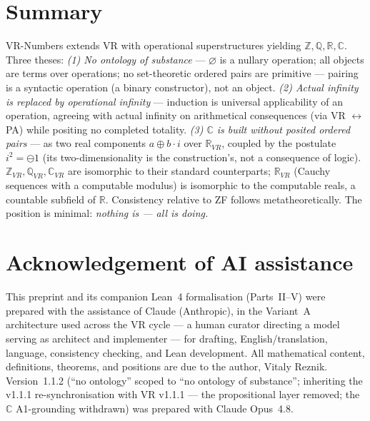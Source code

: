 \documentclass[11pt]{article}
\theoremstyle{definition}
\newcommand{\zero}{\varnothing}
\newcommand{\Z}{\mathbb{Z}}
\newcommand{\Q}{\mathbb{Q}}
\newcommand{\R}{\mathbb{R}}
\newcommand{\C}{\mathbb{C}}
\newcommand{\isub}{\ominus}              %
\begin{document}
\section*{Summary}
VR-Numbers extends VR with operational superstructures yielding $\Z,\Q,\R,\C$. Three theses:
\emph{(1) No ontology of substance} --- $\zero$ is a nullary operation; all objects are terms over operations; no
set-theoretic ordered pairs are primitive --- pairing is a syntactic operation (a binary constructor),
not an object. \emph{(2) Actual infinity is replaced by operational infinity} --- induction
is universal applicability of an operation, agreeing with actual infinity on arithmetical consequences
(via VR $\leftrightarrow$ PA) while positing no completed totality. \emph{(3) $\C$ is built without posited ordered pairs} --- as two real components $a\oplus b\cdot i$
over $\R_{VR}$, coupled by the postulate $i^2=\isub 1$ (its two-dimensionality is the construction's,
not a consequence of logic). $\Z_{VR},\Q_{VR},\C_{VR}$ are
isomorphic to their standard counterparts; $\R_{VR}$ (Cauchy sequences with a computable modulus)
is isomorphic to the computable reals, a countable subfield of $\R$. Consistency relative to ZF follows
metatheoretically. The position is minimal: \emph{nothing is --- all is doing.}

\section*{Acknowledgement of AI assistance}
This preprint and its companion Lean~4 formalisation (Parts~II--V) were prepared with the assistance
of Claude (Anthropic), in the Variant~A architecture used across the VR cycle --- a human curator
directing a model serving as architect and implementer --- for drafting, English/translation, language,
consistency checking, and Lean development. All mathematical content, definitions, theorems, and
positions are due to the author, Vitaly Reznik. Version~1.1.2 (``no ontology'' scoped to ``no ontology of substance''; inheriting the v1.1.1 re-synchronisation with VR v1.1.1 --- the propositional layer removed; the $\C$ A1-grounding
withdrawn) was prepared with Claude Opus~4.8.
\end{document}
